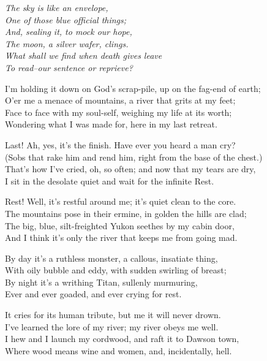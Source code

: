 
\begin{poemblock}
\indentedblock\itshape{
The sky is like an envelope,\\
\idt One of those blue official things;\\
And, sealing it, to mock our hope,\\
\idt The moon, a silver wafer, clings.\\
What shall we find when death gives leave\\
To read--our sentence or reprieve?
}

I'm holding it down on God's scrap-pile, up on the fag-end of earth;\\
\idt O'er me a menace of mountains, a river that grits at my feet;\\
Face to face with my soul-self, weighing my life at its worth;\\
\idt Wondering what I was made for, here in my last retreat.

Last!  Ah, yes, it's the finish.  Have ever you heard a man cry?\\
\idt (Sobs that rake him and rend him, right from the base of the chest.)\\
That's how I've cried, oh, so often; and now that my tears are dry,\\
\idt I sit in the desolate quiet and wait for the infinite Rest.

Rest!  Well, it's restful around me; it's quiet clean to the core.\\
\idt The mountains pose in their ermine, in golden the hills are clad;\\
The big, blue, silt-freighted Yukon seethes by my cabin door,\\
\idt And I think it's only the river that keeps me from going mad.

By day it's a ruthless monster, a callous, insatiate thing,\\
\idt With oily bubble and eddy, with sudden swirling of breast;\\
By night it's a writhing Titan, sullenly murmuring,\\
\idt Ever and ever goaded, and ever crying for rest.

It cries for its human tribute, but me it will never drown.\\
\idt I've learned the lore of my river; my river obeys me well.\\
I hew and I launch my cordwood, and raft it to Dawson town,\\
\idt Where wood means wine and women, and, incidentally, hell.


\end{poemblock}
